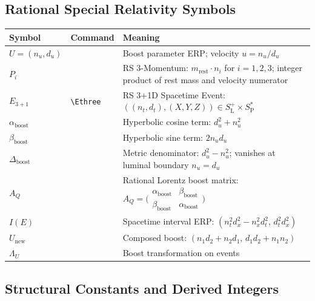 \documentclass[11pt, letterpaper]{article}
\newcommand{\SPs}{S_{\mathrm{P}}^{*}}
\newcommand{\SLpos}{S_{\mathrm{L}}^{+}}
\newcommand{\Ethree}{E_{3+1}}
\theoremstyle{definition}
\theoremstyle{plain}
\begin{document}
\subsection{Rational Special Relativity Symbols}

\begin{longtable}{L{2.5cm} L{2.6cm} L{8.5cm}}
\toprule
\textbf{Symbol} & \textbf{Command} & \textbf{Meaning} \\
\midrule\endhead\bottomrule\endfoot

$U=(n_u,d_u)$ & & Boost parameter ERP; velocity $u=n_u/d_u$ \\[3pt]
$P_i$ & & RS 3-Momentum: $m_{\mathrm{rest}}\cdot n_i$ for
  $i=1,2,3$; integer product of rest mass and velocity numerator \\[3pt]
$\Ethree$ & \verb|\Ethree| & RS 3+1D Spacetime Event:
  $((n_t,d_t),(X,Y,Z))\in\SLpos\times\SPs$ \\[3pt]
$\alpha_{\mathrm{boost}}$ & & Hyperbolic cosine term: $d_u^2+n_u^2$ \\[3pt]
$\beta_{\mathrm{boost}}$ & & Hyperbolic sine term: $2n_u d_u$ \\[3pt]
$\Delta_{\mathrm{boost}}$ & & Metric denominator: $d_u^2-n_u^2$;
  vanishes at luminal boundary $n_u=d_u$ \\[3pt]
$A_Q$ & & Rational Lorentz boost matrix:
  $A_Q=\bigl(\begin{smallmatrix}\alpha_{\mathrm{boost}}&\beta_{\mathrm{boost}}
  \\\beta_{\mathrm{boost}}&\alpha_{\mathrm{boost}}\end{smallmatrix}\bigr)$
  \\[3pt]
$I(E)$ & & Spacetime interval ERP:
  $(n_t^2 d_x^2-n_x^2 d_t^2,\,d_t^2 d_x^2)$ \\[3pt]
$U_{\mathrm{new}}$ & & Composed boost:
  $(n_1 d_2+n_2 d_1,\,d_1 d_2+n_1 n_2)$ \\[3pt]
$\Lambda_U$ & & Boost transformation on events \\[3pt]
\end{longtable}

\subsection{Structural Constants and Derived Integers}
\end{document}
